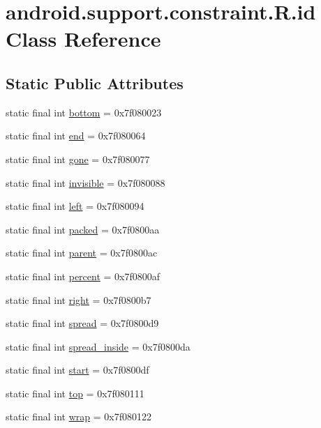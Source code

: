 \hypertarget{classandroid_1_1support_1_1constraint_1_1_r_1_1id}{}\section{android.\+support.\+constraint.\+R.\+id Class Reference}
\label{classandroid_1_1support_1_1constraint_1_1_r_1_1id}
\subsection*{Static Public Attributes}
\begin{DoxyCompactItemize}
\item 
static final int \mbox{\hyperlink{classandroid_1_1support_1_1constraint_1_1_r_1_1id_aac6970b85d00403c4068ba6add94397e}{bottom}} = 0x7f080023
\item 
static final int \mbox{\hyperlink{classandroid_1_1support_1_1constraint_1_1_r_1_1id_a9adc6d511b4404ea9e87c30c0a8b29d5}{end}} = 0x7f080064
\item 
static final int \mbox{\hyperlink{classandroid_1_1support_1_1constraint_1_1_r_1_1id_ad1a680f7fa70080653d47e765b94ba4a}{gone}} = 0x7f080077
\item 
static final int \mbox{\hyperlink{classandroid_1_1support_1_1constraint_1_1_r_1_1id_a4a86e03a08094000bce9ab656c463eb8}{invisible}} = 0x7f080088
\item 
static final int \mbox{\hyperlink{classandroid_1_1support_1_1constraint_1_1_r_1_1id_a2bed15fd0ff924a74b1f55a838780ab4}{left}} = 0x7f080094
\item 
static final int \mbox{\hyperlink{classandroid_1_1support_1_1constraint_1_1_r_1_1id_a6f318bd8cf4a4a7b6bb91ae39aafc8c6}{packed}} = 0x7f0800aa
\item 
static final int \mbox{\hyperlink{classandroid_1_1support_1_1constraint_1_1_r_1_1id_ad1010c30c224329a8e25e8b2721b73ff}{parent}} = 0x7f0800ac
\item 
static final int \mbox{\hyperlink{classandroid_1_1support_1_1constraint_1_1_r_1_1id_a08be8e4ddff0f0dabcfc093e3d88dd73}{percent}} = 0x7f0800af
\item 
static final int \mbox{\hyperlink{classandroid_1_1support_1_1constraint_1_1_r_1_1id_adc461c6efc15f4b4c9ccd96dcb0e8813}{right}} = 0x7f0800b7
\item 
static final int \mbox{\hyperlink{classandroid_1_1support_1_1constraint_1_1_r_1_1id_a19ff6e1cce6df7438948c99f48d6a96c}{spread}} = 0x7f0800d9
\item 
static final int \mbox{\hyperlink{classandroid_1_1support_1_1constraint_1_1_r_1_1id_abe08ca72966af7af713a9537e4a0ff48}{spread\+\_\+inside}} = 0x7f0800da
\item 
static final int \mbox{\hyperlink{classandroid_1_1support_1_1constraint_1_1_r_1_1id_a91e6ac0dae1fd6486cac306d07e888e2}{start}} = 0x7f0800df
\item 
static final int \mbox{\hyperlink{classandroid_1_1support_1_1constraint_1_1_r_1_1id_a2587884e7669658143444a31735a1530}{top}} = 0x7f080111
\item 
static final int \mbox{\hyperlink{classandroid_1_1support_1_1constraint_1_1_r_1_1id_ae0562e247c624b01fdf91a6e003f141d}{wrap}} = 0x7f080122
\end{DoxyCompactItemize}
